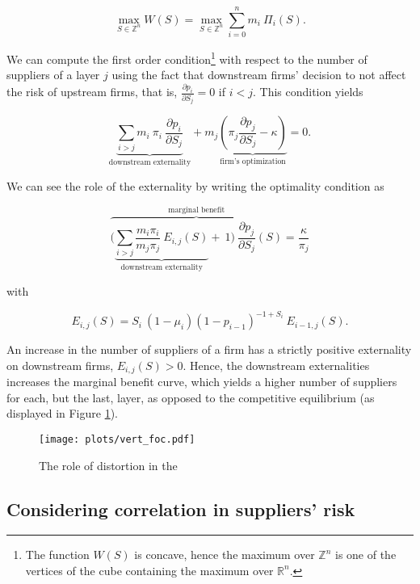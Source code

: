 \documentclass[american, abstract=on]{scrartcl}
\renewcommand{\Re}{\mathbb{R}}
\begin{document}
\begin{equation}
  \max_{S \in \mathbb{Z}^n} W(S) = \max_{S \in \mathbb{Z}^n} \sum^n_{i = 0} m_i \ \Pi_i(S).
\end{equation}

We can compute the first order condition\footnote{The function $W(S)$ is concave, hence the maximum over $\mathbb{Z}^n$ is one of the vertices of the cube containing the maximum over $\Re^n$.} with respect to the number of suppliers of a layer $j$ using the fact that downstream firms' decision to not affect the risk of upstream firms, that is, $\frac{\partial p_i}{\partial S_j} = 0$ if $i < j$. This condition yields

\begin{equation}
  \underbrace{\sum_{i > j} m_i \ \pi_i \ \frac{\partial p_i}{\partial S_j}}_{\text{downstream externality}} + m_j  \underbrace{\left( \pi_j \frac{\partial p_j}{\partial S_j} - \kappa\right)}_{\text{firm's optimization}} = 0.
\end{equation}

We can see the role of the externality by writing the optimality condition as 

\begin{equation} \label{eq:distortion}
  \overbrace{\Bigg(\underbrace{\sum_{i> j} \frac{m_i\pi_i}{m_j\pi_j} \ E_{i, j}(S)}_{\text{downstream externality}} + \ 1 \Bigg)\ \frac{\partial p_j}{\partial S_j}(S)}^{\text{marginal benefit}} = \frac{\kappa}{\pi_j}
\end{equation}

with

\begin{equation}
  E_{i, j}(S) = S_i \ (1 - \mu_i) (1 - p_{i-1})^{-1 + S_i}\ E_{i - 1, j}(S).
\end{equation}

An increase in the number of suppliers of a firm has a strictly positive externality on downstream firms, $E_{i, j}(S) > 0$. Hence, the downstream externalities increases the marginal benefit curve, which yields a higher number of suppliers for each, but the last, layer, as opposed to the competitive equilibrium (as displayed in Figure \ref{fig:vert_foc}).


\begin{figure}[H]
  \centering
  \texttt{[image: plots/vert\_foc.pdf]} 
  \caption{The role of distortion in the }
  \label{fig:vert_foc}
\end{figure}

\subsection{Considering correlation in suppliers' risk} \label{sec:vertical:considering}
\end{document}
